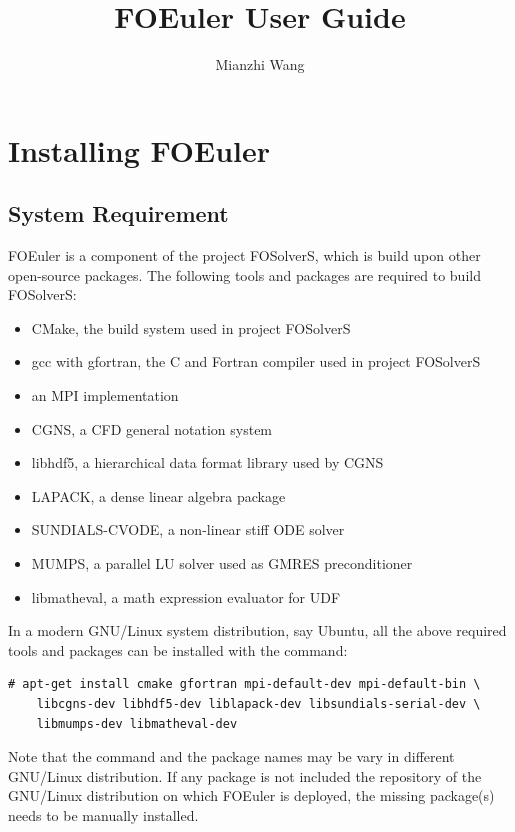 \documentclass[]{article}
\title{FOEuler User Guide}
\author{Mianzhi Wang}
\begin{document}
\maketitle

\tableofcontents

\section{Installing FOEuler}

\subsection{System Requirement}
\label{sec:requirement}

FOEuler is a component of the project FOSolverS, which is build upon other open-source packages.
The following tools and packages are required to build FOSolverS:
\begin{itemize}
  \item CMake, the build system used in project FOSolverS
  \item gcc with gfortran, the C and Fortran compiler used in project FOSolverS
  \item an MPI implementation
  \item CGNS, a CFD general notation system
  \item libhdf5, a hierarchical data format library used by CGNS
  \item LAPACK, a dense linear algebra package
  \item SUNDIALS-CVODE, a non-linear stiff ODE solver
  \item MUMPS, a parallel LU solver used as GMRES preconditioner
  \item libmatheval, a math expression evaluator for UDF
\end{itemize}
In a modern GNU/Linux system distribution, say Ubuntu, all the above required tools and packages can
be installed with the command:
\begin{lstlisting}[backgroundcolor=\color{lightgray}]
  # apt-get install cmake gfortran mpi-default-dev mpi-default-bin \
    libcgns-dev libhdf5-dev liblapack-dev libsundials-serial-dev \
    libmumps-dev libmatheval-dev
\end{lstlisting}
Note that the command and the package names may be vary in different GNU/Linux distribution.
If any package is not included the repository of the GNU/Linux distribution on which FOEuler is
deployed, the missing package(s) needs to be manually installed.
\end{document}
